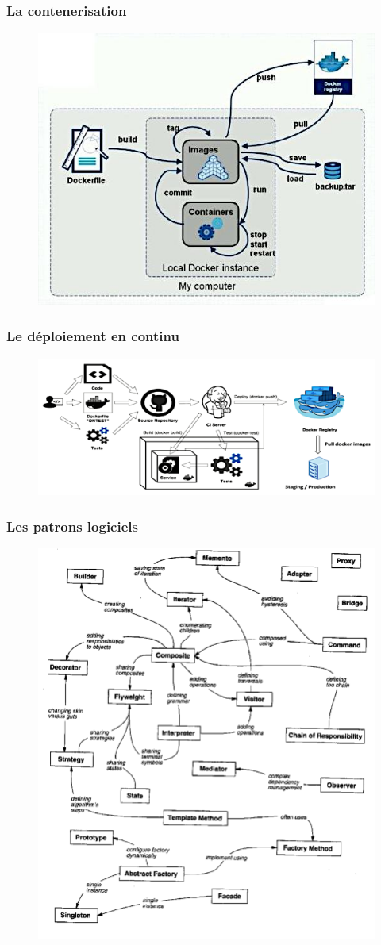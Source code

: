\begin{frame}
    \frametitle{La contenerisation}

    \begin{figure}
        \centering
        \includegraphics[height=0.5\linewidth]{figures/introduction/docker}
        \label{fig:conteneur}
    \end{figure}
\end{frame}

\begin{frame}
    \frametitle{Le déploiement en continu}

    \begin{figure}
        \centering
        \includegraphics[width=\linewidth]{figures/introduction/continuous-deployment}
        \label{fig:deployment}
    \end{figure}
\end{frame}

\begin{frame}
    \frametitle{Les patrons logiciels}

    \begin{figure}
        \centering
        \includegraphics[height=0.5\linewidth]{figures/introduction/patrons}
        \label{fig:patrons}
    \end{figure}
\end{frame}

